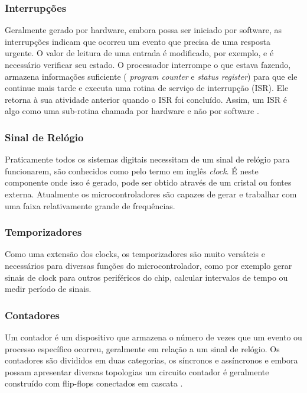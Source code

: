 \subsubsection{Interrupções}

Geralmente gerado por hardware, embora possa ser iniciado por software, as interrupções indicam que ocorreu um evento que precisa de uma resposta urgente. O valor de leitura de uma entrada é modificado, por exemplo, e é necessário verificar seu estado. O processador interrompe o que estava fazendo, armazena informações suficiente ( \textit{program counter} e \textit{status register}) para que ele continue mais tarde e executa uma rotina de serviço de interrupção (ISR). Ele retorna à sua atividade anterior quando o ISR foi concluído. Assim, um ISR é algo como uma sub-rotina chamada por hardware e não por software \cite{Basics2008}.

\subsubsection{Sinal de Relógio}

Praticamente todos os sistemas digitais necessitam de um sinal de relógio para funcionarem, são conhecidos como pelo termo em inglês \textit{clock}. É neste componente onde isso é gerado, pode ser obtido através de um cristal ou fontes externa. Atualmente os microcontroladores são capazes de gerar e trabalhar com uma faixa relativamente grande de frequências.

\subsubsection{Temporizadores}

Como uma extensão dos clocks, os temporizadores são muito versáteis e necessários para diversas funções do microcontrolador, como por exemplo gerar sinais de clock para outros periféricos do chip, calcular intervalos de tempo ou medir período de sinais.

\subsubsection*{Contadores}

Um contador é um dispositivo que armazena  o número de vezes que um evento ou processo específico ocorreu, geralmente em relação a um sinal de relógio. Os contadores são divididos em duas categorias, os síncronos e assíncronos e embora possam apresentar diversas topologias um circuito  contador é geralmente construído com flip-flops conectados em cascata \cite{Floyd2007}.


